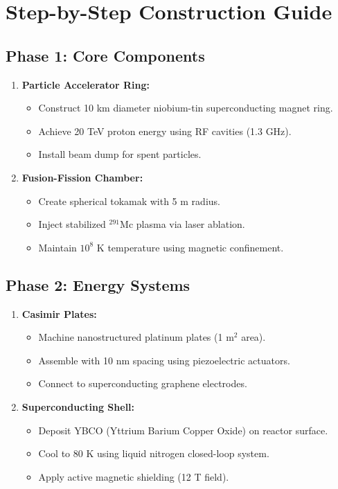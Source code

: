 \documentclass[12pt, a4paper]{article}
\begin{document}
\section{Step-by-Step Construction Guide}
\subsection{Phase 1: Core Components}
\begin{enumerate}[leftmargin=*]
\item \textbf{Particle Accelerator Ring:}
\begin{itemize}
\item Construct 10 km diameter niobium-tin superconducting magnet ring.
\item Achieve 20 TeV proton energy using RF cavities (1.3 GHz).
\item Install beam dump for spent particles.
\end{itemize}

\item \textbf{Fusion-Fission Chamber:}
\begin{itemize}
\item Create spherical tokamak with 5 m radius.
\item Inject stabilized \(^{291}\text{Mc}\) plasma via laser ablation.
\item Maintain \(10^8\) K temperature using magnetic confinement.
\end{itemize}
\end{enumerate}

\subsection{Phase 2: Energy Systems}
\begin{enumerate}[leftmargin=*, start=3]
\item \textbf{Casimir Plates:}
\begin{itemize}
\item Machine nanostructured platinum plates (1 m\(^2\) area).
\item Assemble with 10 nm spacing using piezoelectric actuators.
\item Connect to superconducting graphene electrodes.
\end{itemize}

\item \textbf{Superconducting Shell:}
\begin{itemize}
\item Deposit YBCO (Yttrium Barium Copper Oxide) on reactor surface.
\item Cool to 80 K using liquid nitrogen closed-loop system.
\item Apply active magnetic shielding (12 T field).
\end{itemize}
\end{enumerate}
\end{document}
